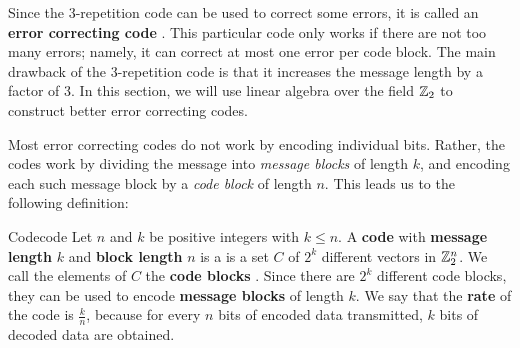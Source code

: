 Since the 3-repetition code can be used to correct some errors, it is
called an \textbf{error correcting code}%
%
. This
particular code only works if there are not too many errors; namely,
it can correct at most one error per code block. The main drawback of
the 3-repetition code is that it increases the message length by a
factor of 3. In this section, we will use linear algebra over the
field $\mathbb{Z}_2$ to construct better error correcting codes.

Most error correcting codes do not work by encoding individual
bits. Rather, the codes work by dividing the message into
\textit{message blocks} of length $k$, and encoding each such message
block by a \textit{code block} of length $n$.  This leads us to the
following definition:

\begin{definition}{Code}{code}
  Let $n$ and $k$ be positive integers with $k\leq n$. A
  \textbf{code}%
   with \textbf{message length}%
   $k$ and \textbf{block
    length}%
   $n$ is a is a set $C$ of
  $2^k$ different vectors in $\mathbb{Z}_2^n$. We call the elements of $C$ the
  \textbf{code blocks}%
  . Since there are $2^k$ different code
  blocks, they can be used to encode \textbf{message blocks}%
   of length $k$. We say that the
  \textbf{rate}%
   of the code is $\frac{k}{n}$,
  because for every $n$ bits of encoded data transmitted, $k$
  bits of decoded data are obtained.
\end{definition}

